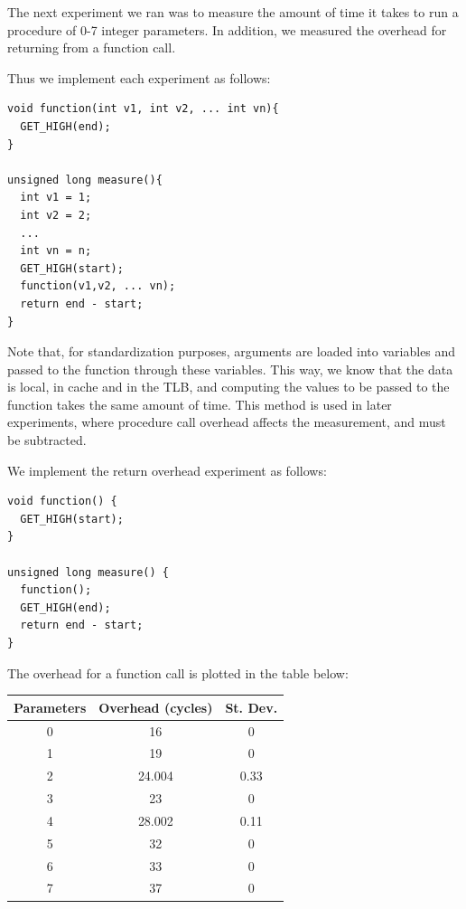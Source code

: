 The next experiment we ran was to measure the amount of time it takes to run a procedure of 0-7 integer parameters. In addition, we measured the overhead for returning from a function call. 

Thus we implement each experiment as follows: 
\begin{verbatim}
void function(int v1, int v2, ... int vn){
  GET_HIGH(end);
}

unsigned long measure(){
  int v1 = 1;
  int v2 = 2;
  ...
  int vn = n;
  GET_HIGH(start);
  function(v1,v2, ... vn);
  return end - start;
}
\end{verbatim}

Note that, for standardization purposes, arguments are loaded into variables and passed to the function through these variables. This way, we know that the data is local, in cache and in the TLB, and computing the values to be passed to the function takes the same amount of time. This method is used in later experiments, where procedure call overhead affects the measurement, and must be subtracted.

We implement the return overhead experiment as follows:
\begin{verbatim}
void function() {
  GET_HIGH(start);
}

unsigned long measure() {
  function();
  GET_HIGH(end);
  return end - start;
}
\end{verbatim}

\newpage

\noindent The overhead for a function call is plotted in the table below:
\newline
\newline
\begin{tabular}{c|c|c}

	\textbf{Parameters} & \textbf{Overhead (cycles)} & \textbf{St. Dev.} \\\hline
	0 & 16 & 0\\\hline
	1 & 19 & 0\\\hline
	2 & 24.004 & 0.33\\\hline
	3 & 23 & 0\\\hline
	4 & 28.002 & 0.11\\\hline
	5 & 32 & 0\\\hline
	6 & 33 & 0\\\hline
	7 & 37 & 0\\\hline

\end{tabular}
\newline
\newline


